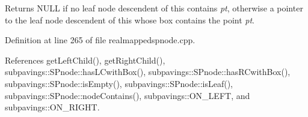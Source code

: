 \begin{DoxyReturn}{\-Returns}
\-N\-U\-L\-L if no leaf node descendent of this contains {\itshape pt\/}, otherwise a pointer to the leaf node descendent of this whose box contains the point {\itshape pt\/}. 
\end{DoxyReturn}


\-Definition at line 265 of file realmappedspnode.\-cpp.



\-References get\-Left\-Child(), get\-Right\-Child(), subpavings\-::\-S\-Pnode\-::has\-L\-Cwith\-Box(), subpavings\-::\-S\-Pnode\-::has\-R\-Cwith\-Box(), subpavings\-::\-S\-Pnode\-::is\-Empty(), subpavings\-::\-S\-Pnode\-::is\-Leaf(), subpavings\-::\-S\-Pnode\-::node\-Contains(), subpavings\-::\-O\-N\-\_\-\-L\-E\-F\-T, and subpavings\-::\-O\-N\-\_\-\-R\-I\-G\-H\-T.


